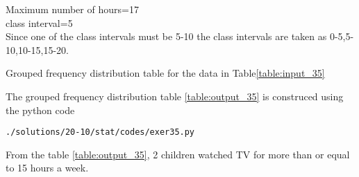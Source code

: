 Maximum number of hours=17\\
class interval=5\\
Since one of the class intervals must be 5-10 the class intervals are taken as 0-5,5-10,10-15,15-20.
\begin{table}[ht!]
\centering

\caption{Grouped frequency distribution table for the data in Table\ref{table:input_35}}
\label{table:output_35}
\end{table}
The grouped frequency distribution table \ref{table:output_35} is construced using the python code
\begin{lstlisting}
./solutions/20-10/stat/codes/exer35.py
\end{lstlisting}
From the table \ref{table:output_35}, 2 children watched TV for more than or equal to 15 hours a week. 
